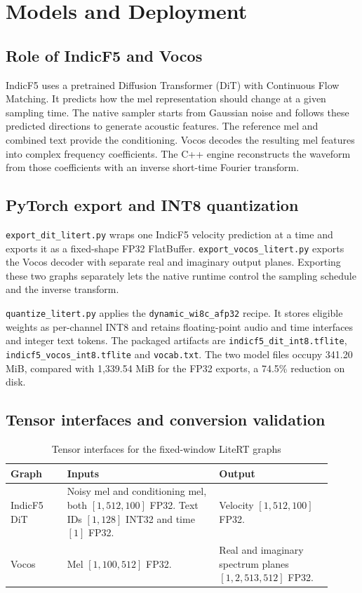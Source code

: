 \chapter{Models and Deployment}

\section{Role of IndicF5 and Vocos}

IndicF5 uses a pretrained Diffusion Transformer (DiT) with Continuous Flow
Matching. It predicts how the mel representation should change at a given
sampling time. The native sampler starts from Gaussian noise and follows these
predicted directions to generate acoustic features. The reference mel and
combined text provide the conditioning. Vocos decodes the resulting mel
features into complex frequency coefficients. The C++ engine reconstructs the
waveform from those coefficients with an inverse short-time Fourier transform.

\section{PyTorch export and INT8 quantization}

\texttt{export\_dit\_litert.py} wraps one IndicF5 velocity prediction at a
time and exports it as a fixed-shape FP32 FlatBuffer.
\texttt{export\_vocos\_litert.py} exports the Vocos decoder with separate
real and imaginary output planes. Exporting these two graphs separately lets
the native runtime control the sampling schedule and the inverse transform.

\texttt{quantize\_litert.py} applies the
\texttt{dynamic\_wi8c\_afp32} recipe. It stores eligible weights as
per-channel INT8 and retains floating-point audio and time interfaces and
integer text tokens. The packaged artifacts are
\texttt{indicf5\_dit\_int8.tflite}, \texttt{indicf5\_vocos\_int8.tflite}
and \texttt{vocab.txt}. The two model files occupy 341.20 MiB, compared with
1,339.54 MiB for the FP32 exports, a 74.5\% reduction on disk.

\clearpage
\section{Tensor interfaces and conversion validation}

\begin{table}[!ht]
\centering
\caption{Tensor interfaces for the fixed-window LiteRT graphs}
\label{tab:model-tensors}
\small
\begin{tabular}{@{}p{0.16\linewidth}p{0.43\linewidth}p{0.32\linewidth}@{}}
\toprule
Graph & Inputs & Output \\
\midrule
IndicF5 DiT &
Noisy mel and conditioning mel, both $[1,512,100]$ FP32. Text IDs
$[1,128]$ INT32 and time $[1]$ FP32. &
Velocity $[1,512,100]$ FP32. \\
Vocos & Mel $[1,100,512]$ FP32. &
Real and imaginary spectrum planes $[1,2,513,512]$ FP32. \\
\bottomrule
\end{tabular}
\end{table}

